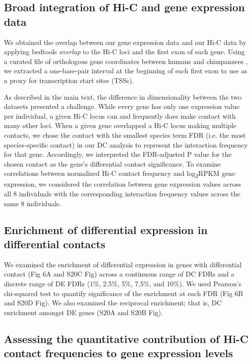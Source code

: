 \subsection{Broad integration of Hi-C and gene expression data}

We obtained the overlap between our gene expression data and our Hi-C data by applying bedtools \textit{overlap} \cite{Quinlan.2010} to the Hi-C loci and the first exon of each gene. Using a curated file of orthologous gene coordinates between humans and chimpanzees \cite{Pavlovic.2018}, we extracted a one-base-pair interval at the beginning of each first exon to use as a proxy for transcription start sites (TSSs).

As described in the main text, the difference in dimensionality between the two datasets presented a challenge. While every gene has only one expression value per individual, a given Hi-C locus can and frequently does make contact with many other loci. When a given gene overlapped a Hi-C locus making multiple contacts, we chose the contact with the smallest species term FDR (i.e. the most species-specific contact) in our DC analysis to represent the interaction frequency for that gene. Accordingly, we interpreted the FDR-adjusted P value for the chosen contact as the gene's differential contact significance. To examine correlations between normalized Hi-C contact frequency and log\textsubscript{2}RPKM gene expression, we considered the correlation between gene expression values across all 8 individuals with the corresponding interaction frequency values across the same 8 individuals.

\subsection{Enrichment of differential expression in differential contacts}

We examined the enrichment of differential expression in genes with differential contact (Fig 6A and S20C Fig) across a continuous range of DC FDRs and a discrete range of DE FDRs (1\%, 2.5\%, 5\%, 7.5\%, and 10\%). We used Pearson's chi-squared test to quantify significance of the enrichment at each FDR (Fig 6B and S20D Fig). We also examined the reciprocal enrichment; that is, DC enrichment amongst DE genes (S20A and S20B Fig).

\subsection{Assessing the quantitative contribution of Hi-C contact frequencies to gene expression levels}

